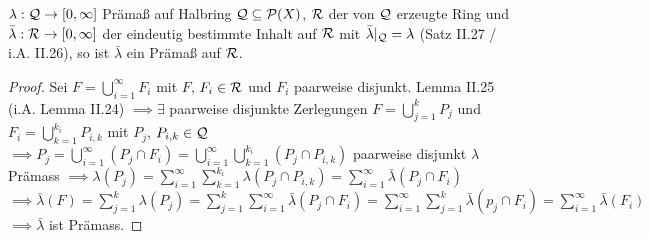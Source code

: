 \documentclass[11pt,a4paper,fleqn,openany]{report}
\begin{document}
    \begin{theorem}[i.A. II.29]
      $\lambda: \mathcal{Q} \to [0, \infty]$ Prämaß auf Halbring $\mathcal{Q} \subseteq \mathcal{P}(X)$, $\mathcal{R}$ der von $\mathcal{Q}$ erzeugte Ring und $\bar{\lambda}: \mathcal{R} \to [0,\infty]$ der eindeutig bestimmte Inhalt auf $\mathcal{R}$ mit $\bar{\lambda}|_{\mathcal{Q}}=\lambda$ (Satz II.27 / i.A. II.26), so ist $\bar{\lambda}$ ein Prämaß auf $\mathcal{R}$.
    \end{theorem}

    \begin{proof}
      Sei $F = \bigcup\limits_{i=1}^{\infty}F_i$ mit $F$, $F_i\in\mathcal{R}$ und $F_i$ paarweise disjunkt. \newline
      Lemma II.25 (i.A. Lemma II.24) $\implies \exists$ paarweise disjunkte Zerlegungen $F = \bigcup\limits_{j=1}^{k}P_j$ und $F_i = \bigcup\limits_{k=1}^{k_i}P_{i,k}$ mit $P_j$, $P_{i,k}\in\mathcal{Q}$ \newline
      $\implies P_j = \bigcup\limits_{i=1}^{\infty}(P_j \cap F_i) = \bigcup\limits_{i=1}^{\infty}\bigcup\limits_{k=1}^{k_i}(P_j \cap P_{i,k})$ paarweise disjunkt \newline
      $\lambda$ Prämass $\implies \lambda(P_j) = \sum\limits_{i=1}^{\infty}\sum\limits_{k=1}^{k_i}\lambda(P_j\cap P_{i,k}) = \sum\limits_{i=1}^{\infty}\bar{\lambda}(P_j\cap F_i)$ \newline
      $\implies \bar{\lambda}(F) = \sum\limits_{j=1}^{k}\lambda(P_j) = \sum\limits_{j=1}^{k}\sum\limits_{i=1}^{\infty}\bar{\lambda}(P_j\cap F_i) = \sum\limits_{i=1}^{\infty}\sum\limits_{j=1}^{k}\bar{\lambda}(p_j\cap F_i) = \sum\limits_{i=1}^{\infty}\bar{\lambda}(F_i)$ \newline
      $\implies \bar{\lambda}$ ist Prämass.
    \end{proof}

    
\end{document}
